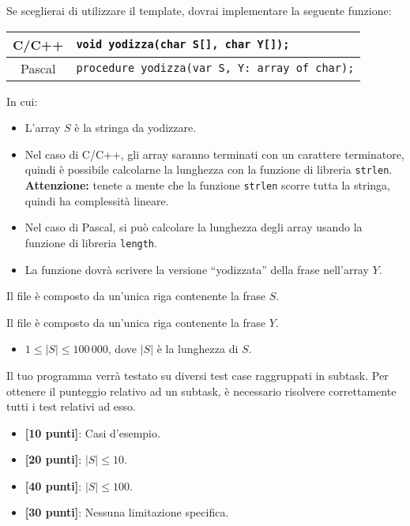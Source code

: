 Se sceglierai di utilizzare il template, dovrai implementare la seguente funzione:
\begin{center}\begin{tabularx}{\textwidth}{|c|X|}
\hline
C/C++  & \verb|void yodizza(char S[], char Y[]);|\\
\hline
Pascal & \verb|procedure yodizza(var S, Y: array of char);|\\
\hline
\end{tabularx}\end{center}
In cui:
\begin{itemize}[nolistsep]
  \item L'array $S$ è la stringa da yodizzare.
  \item Nel caso di C/C++, gli array saranno terminati con un carattere terminatore, quindi è possibile calcolarne la lunghezza con la funzione di libreria \texttt{strlen}. \textbf{Attenzione:} tenete a mente che la funzione \texttt{strlen} scorre tutta la stringa, quindi ha complessità lineare.
  \item Nel caso di Pascal, si può calcolare la lunghezza degli array usando la funzione di libreria \texttt{length}.
  \item La funzione dovrà scrivere la versione ``yodizzata'' della frase nell'array $Y$.
\end{itemize}

\InputFile
Il file  è composto da un'unica riga contenente la frase $S$.

\OutputFile
Il file \outputfile{} è composto da un'unica riga contenente la frase $Y$.

\Constraints
\begin{itemize}[nolistsep, itemsep=2mm]
  \item $1 \le |S| \le 100\,000$, dove $|S|$ è la lunghezza di $S$.
\end{itemize}

\Scoring
Il tuo programma verrà testato su diversi test case raggruppati in subtask.
Per ottenere il punteggio relativo ad un subtask, è necessario risolvere
correttamente tutti i test relativi ad esso.

\begin{itemize}[nolistsep,itemsep=2mm]
  \item \textbf{ [10 punti]}: Casi d'esempio.
  \item \textbf{ [20 punti]}: $|S| \leq 10$.
  \item \textbf{ [40 punti]}: $|S| \leq 100$.
  \item \textbf{ [30 punti]}: Nessuna limitazione specifica.
\end{itemize}



\Examples
\begin{example}
%
%
\end{example}
